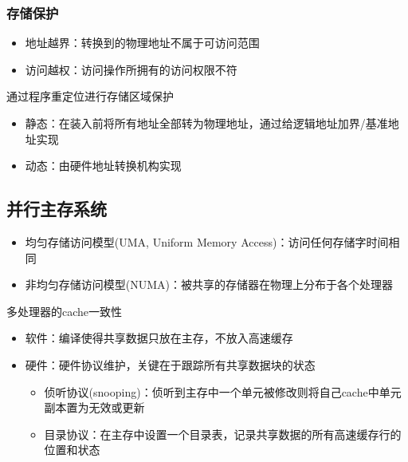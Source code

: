\subsubsection{存储保护}
\begin{itemize}
	\item 地址越界：转换到的物理地址不属于可访问范围
	\item 访问越权：访问操作所拥有的访问权限不符
\end{itemize}
通过程序重定位进行存储区域保护
\begin{itemize}
	\item 静态：在装入前将所有地址全部转为物理地址，通过给逻辑地址加界/基准地址实现
	\item 动态：由硬件地址转换机构实现
\end{itemize}

\subsection{并行主存系统}
\begin{itemize}
	\item 均匀存储访问模型(UMA, Uniform Memory Access)：访问任何存储字时间相同
	\item 非均匀存储访问模型(NUMA)：被共享的存储器在物理上分布于各个处理器
\end{itemize}
多处理器的cache一致性
\begin{itemize}
	\item 软件：编译使得共享数据只放在主存，不放入高速缓存
	\item 硬件：硬件协议维护，关键在于跟踪所有共享数据块的状态
	\begin{itemize}
		\item 侦听协议(snooping)：侦听到主存中一个单元被修改则将自己cache中单元副本置为无效或更新
		\item 目录协议：在主存中设置一个目录表，记录共享数据的所有高速缓存行的位置和状态
	\end{itemize}
\end{itemize}